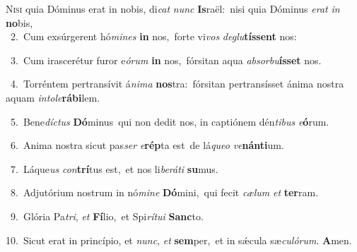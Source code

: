 \lettrine{\initial\textcolor{\initialcolor}{N}}{isi} quia Dóminus erat in nobis, di\textit{cat} \textit{nunc} \textbf{Is}\-raël:~\star nisi quia Dóminus \textit{e}\-\textit{rat} \textit{in} \textbf{no}\-bis,\\
{\numbfont\textcolor{\numbcolor}{~2.}}~Cum exsúrgerent hó\-\textit{mi}\-\textit{nes} \textbf{in} nos,~\star forte vi\textit{vos} \textit{de}\-\textit{glu}\textbf{tís}\textbf{sent} nos:\par
{\numbfont\textcolor{\numbcolor}{~3.}}~Cum irascerétur furor e\-\textit{ó}\-\textit{rum} \textbf{in} nos,~\star fórsitan aqua \textit{ab}\-\textit{sor}\textit{bu}\textbf{ís}\textbf{set} nos.\par
{\numbfont\textcolor{\numbcolor}{~4.}}~Torréntem pertransívit á\-\textit{ni}\-\textit{ma} \textbf{nos}\-tra:~\star fórsitan pertransísset ánima nostra aquam \textit{in}\-\textit{to}\textit{le}\textbf{rá}\textbf{bi}lem.\par
{\numbfont\textcolor{\numbcolor}{~5.}}~Bene\-\textit{díc}\-\textit{tus} \textbf{Dó}\-minus~\star qui non dedit nos, in captiónem dén\-\textit{ti}\-\textit{bus} \textit{e}\-\textbf{ó}rum.\par
{\numbfont\textcolor{\numbcolor}{~6.}}~Anima nostra sicut pas\textit{ser} \textit{e}\-\textbf{rép}ta est~\star de lá\-\textit{que}\-\textit{o} \textit{ve}\-\textbf{nán}\textbf{ti}um.\par
{\numbfont\textcolor{\numbcolor}{~7.}}~Láque\textit{us} \textit{con}\-\textbf{trí}tus est,~\star et nos li\-\textit{be}\-\textit{rá}\textit{ti} \textbf{su}\-mus.\par
{\numbfont\textcolor{\numbcolor}{~8.}}~Adjutórium nostrum in nó\-\textit{mi}\-\textit{ne} \textbf{Dó}\-mini,~\star qui fecit \textit{cæ}\-\textit{lum} \textit{et} \textbf{ter}\-ram.\par
{\numbfont\textcolor{\numbcolor}{~9.}}~Glória Pa\-\textit{tri}\-, \textit{et} \textbf{Fí}\-lio,~\star et Spi\-\textit{rí}\-\textit{tu}\textit{i} \textbf{Sanc}\-to.\par
{\numbfont\textcolor{\numbcolor}{10.}}~Sicut erat in princípio, et \textit{nunc}\-, \textit{et} \textbf{sem}\-per,~\star et in sǽcula sæ\-\textit{cu}\-\textit{ló}\textit{rum}. \textbf{A}\-men.\par
